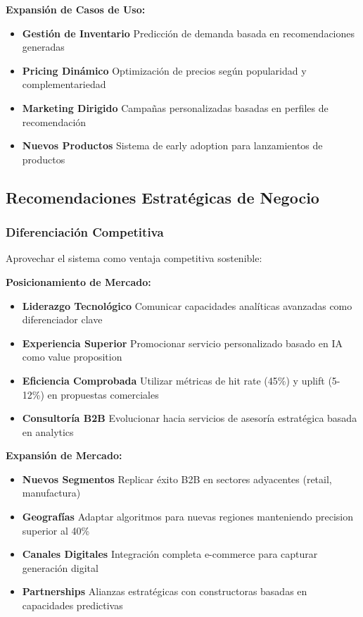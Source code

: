 \documentclass[twocolumn]{article}
\begin{document}
\textbf{Expansión de Casos de Uso:}
\begin{itemize}
    \item \textbf{Gestión de Inventario} Predicción de demanda basada en recomendaciones generadas
    \item \textbf{Pricing Dinámico} Optimización de precios según popularidad y complementariedad
    \item \textbf{Marketing Dirigido} Campañas personalizadas basadas en perfiles de recomendación
    \item \textbf{Nuevos Productos} Sistema de early adoption para lanzamientos de productos
\end{itemize}

\subsection{Recomendaciones Estratégicas de Negocio}

\subsubsection{Diferenciación Competitiva}

Aprovechar el sistema como ventaja competitiva sostenible:

\textbf{Posicionamiento de Mercado:}
\begin{itemize}
    \item \textbf{Liderazgo Tecnológico} Comunicar capacidades analíticas avanzadas como diferenciador clave
    \item \textbf{Experiencia Superior} Promocionar servicio personalizado basado en IA como value proposition
    \item \textbf{Eficiencia Comprobada} Utilizar métricas de hit rate (45\%) y uplift (5-12\%) en propuestas comerciales
    \item \textbf{Consultoría B2B} Evolucionar hacia servicios de asesoría estratégica basada en analytics
\end{itemize}

\textbf{Expansión de Mercado:}
\begin{itemize}
    \item \textbf{Nuevos Segmentos} Replicar éxito B2B en sectores adyacentes (retail, manufactura)
    \item \textbf{Geografías} Adaptar algoritmos para nuevas regiones manteniendo precision superior al 40\%
    \item \textbf{Canales Digitales} Integración completa e-commerce para capturar generación digital
    \item \textbf{Partnerships} Alianzas estratégicas con constructoras basadas en capacidades predictivas
\end{itemize}
\end{document}

